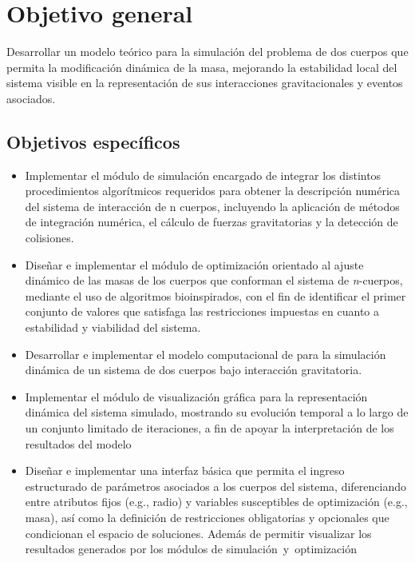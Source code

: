 \section{Objetivo general}
Desarrollar un modelo teórico para la simulación del problema de dos cuerpos que permita la modificación dinámica de la masa, mejorando la estabilidad local del sistema visible en la representación de sus interacciones gravitacionales y eventos asociados.
\subsection{Objetivos específicos}
\begin{itemize}
    \item Implementar el módulo de simulación encargado de integrar los distintos procedimientos algorítmicos requeridos para obtener la descripción numérica del sistema de interacción de n cuerpos, incluyendo la aplicación de métodos de integración numérica, el cálculo de fuerzas gravitatorias y la detección de colisiones.

    \item Diseñar e implementar el módulo de optimización orientado al ajuste dinámico de las masas de los cuerpos que conforman el sistema de \textit{n}-cuerpos, mediante el uso de algoritmos bioinspirados, con el fin de identificar el primer conjunto de valores que satisfaga las restricciones impuestas en cuanto a estabilidad y viabilidad del sistema.

    \item Desarrollar e implementar el modelo computacional de para la simulación dinámica de un sistema de dos cuerpos bajo interacción gravitatoria.

    \item Implementar el módulo de visualización gráfica para la representación dinámica del sistema simulado, mostrando su evolución temporal a lo largo de un conjunto limitado de iteraciones, a fin de apoyar la interpretación de los resultados del modelo

    \item Diseñar e implementar una interfaz básica que permita el ingreso estructurado de parámetros asociados a los cuerpos del sistema, diferenciando entre atributos fijos (e.g., radio) y variables susceptibles de optimización (e.g., masa), así como la definición de restricciones obligatorias y opcionales que condicionan el espacio de soluciones. Además de permitir visualizar los resultados generados por los módulos de simulación y optimización
\end{itemize}